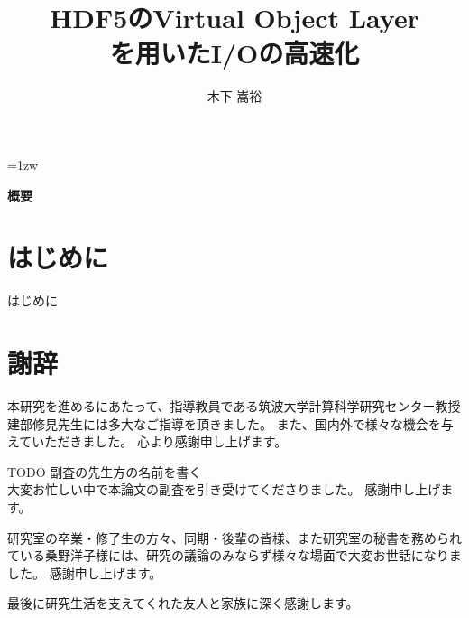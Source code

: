 \documentclass[a4paper,11pt]{jreport}
\title{HDF5のVirtual Object Layer\\を用いたI/Oの高速化}
\author{木下 嵩裕}
\begin{document}
\maketitle
\thispagestyle{empty}
\newpage

\thispagestyle{empty}
\vspace*{20pt plus 1fil}
\parindent=1zw
\noindent
\begin{center}
{\bf 概要}
\vspace{5mm}
\end{center}

\par
\vspace{0pt plus 1fil}
\newpage

\tableofcontents
\listoffigures

\pagebreak \setcounter{page}{1}




\chapter{はじめに}

はじめに




\chapter*{謝辞}

本研究を進めるにあたって、指導教員である筑波大学計算科学研究センター教授 建部修見先生には多大なご指導を頂きました。
また、国内外で様々な機会を与えていただきました。
心より感謝申し上げます。

TODO 副査の先生方の名前を書く \\
大変お忙しい中で本論文の副査を引き受けてくださりました。
感謝申し上げます。

研究室の卒業・修了生の方々、同期・後輩の皆様、また研究室の秘書を務められている桑野洋子様には、研究の議論のみならず様々な場面で大変お世話になりました。
感謝申し上げます。

最後に研究生活を支えてくれた友人と家族に深く感謝します。

\newpage

\renewcommand{\bibname}{参考文献}



\end{document}
